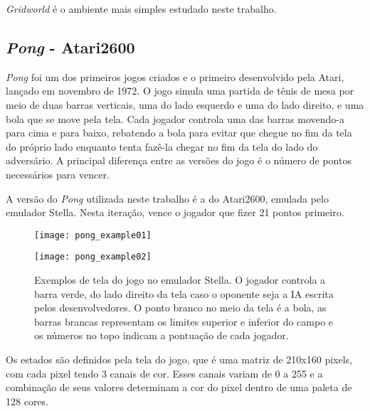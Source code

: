 \textit{Gridworld} é o ambiente mais simples estudado neste trabalho.

\subsection{\textit{Pong} - Atari2600}
\label{sec:pong}

\textit{Pong} foi um dos primeiros jogos criados e o primeiro desenvolvido pela Atari, lançado em novembro de 1972.
O jogo simula uma partida de tênis de mesa por meio de duas barras verticais, uma do lado esquerdo e uma do lado direito, e uma bola que se move pela tela.
Cada jogador controla uma das barras movendo-a para cima e para baixo, rebatendo a bola para evitar que chegue no fim da tela do próprio lado enquanto tenta fazê-la chegar no fim da tela do lado do adversário.
A principal diferença entre as versões do jogo é o número de pontos necessários para vencer.

A versão do \textit{Pong} utilizada neste trabalho é a do Atari2600, emulada pelo emulador Stella.
Nesta iteração, vence o jogador que fizer 21 pontos primeiro.

\begin{figure}[h!]
  \begin{minipage}[b]{.5\textwidth}
  \centering
  \texttt{[image: pong\_example01]}
  \end{minipage}
  \hfill
  \begin{minipage}[b]{.5\textwidth}
  \texttt{[image: pong\_example02]}
  \end{minipage}
  \caption{Exemplos de tela do jogo no emulador Stella. O jogador controla a barra verde, do lado direito da tela caso o oponente seja a IA escrita pelos desenvolvedores. O ponto branco no meio da tela é a bola, as barras brancas representam os limites superior e inferior do campo e os números no topo indicam a pontuação de cada jogador.}
\end{figure}

Os estados são definidos pela tela do jogo, que é uma matriz de 210x160 pixels, com cada pixel tendo 3 canais de cor.
Esses canais variam de 0 a 255 e a combinação de seus valores determinam a cor do pixel dentro de uma paleta de 128 cores.

